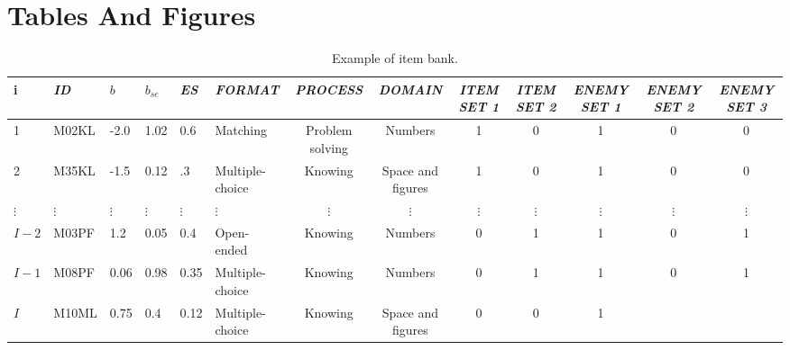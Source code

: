 
\chapter{Tables And Figures}\label{sec:TablesAndFigures} %

\label{ch:TablesAndFigures} %
\begin{table}
	\scriptsize
	\centering \begin{tabular}{llllllccccccc}
		\hline
		i & \textsl{ID} & $b$ & $b_{se}$ & \textsl{ES} & \textsl{FORMAT} & \textsl{PROCESS} & \textsl{DOMAIN} & \textsl{ITEM SET 1} & \textsl{ITEM SET 2} & \textsl{ENEMY SET 1} & \textsl{ENEMY SET 2} & \textsl{ENEMY SET 3} \\ \hline
		1 & M02KL & -2.0 & 1.02 & 0.6& Matching & Problem solving & Numbers& 1 & 0 & 1 & 0 & 0 \\
		2 & M35KL & -1.5 & 0.12 & .3& Multiple-choice & Knowing & Space and figures & 1& 0& 1 & 0 & 0 \\
		$\vdots$ & $\vdots$ & $\vdots$ & $\vdots$ & $\vdots$ & $\vdots$ & $\vdots$ & $\vdots$ & $\vdots$ & $\vdots$ & $\vdots$ & $\vdots$ & $\vdots$ \\
		$I-2$ & M03PF & 1.2 & 0.05 & 0.4 & Open-ended & Knowing & Numbers & 0& 1& 1 & 0 & 1 \\
		$I-1$ & M08PF & 0.06 & 0.98 & 0.35 & Multiple-choice & Knowing & Numbers & 0& 1& 1 & 0 & 1 \\
		$I$ & M10ML & 0.75 & 0.4 & 0.12 & Multiple-choice & Knowing & Space and figures & 0 & 0 & 1
	\end{tabular}
	\caption{Example of item bank.\label{fig:tabitembank}}
\end{table}


